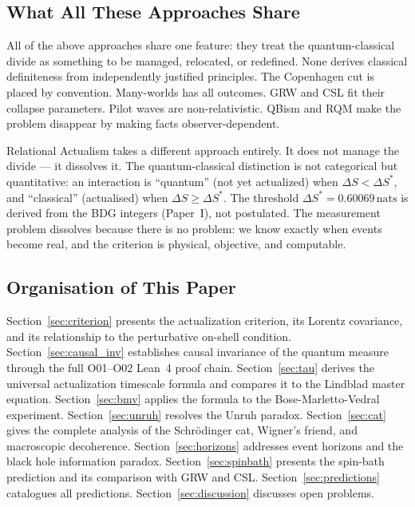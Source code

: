 \documentclass[12pt,a4paper]{article}
\begin{document}
\subsection{What All These Approaches Share}

All of the above approaches share one feature: they treat the quantum-classical divide as something to be managed, relocated, or redefined.  None derives classical definiteness from independently justified principles.  The Copenhagen cut is placed by convention.  Many-worlds has all outcomes.  GRW and CSL fit their collapse parameters.  Pilot waves are non-relativistic.  QBism and RQM make the problem disappear by making facts observer-dependent.

Relational Actualism takes a different approach entirely.  It does not manage the divide --- it dissolves it.  The quantum-classical distinction is not categorical but quantitative: an interaction is ``quantum'' (not yet actualized) when $\Delta S<\Delta S^*$, and ``classical'' (actualised) when $\Delta S\geq\Delta S^*$.  The threshold $\Delta S^*=0.60069\,\mathrm{nats}$ is derived from the BDG integers (Paper~I), not postulated.  The measurement problem dissolves because there is no problem: we know exactly when events become real, and the criterion is physical, objective, and computable.

\subsection{Organisation of This Paper}

Section~\ref{sec:criterion} presents the actualization criterion, its Lorentz covariance, and its relationship to the perturbative on-shell condition.  Section~\ref{sec:causal_inv} establishes causal invariance of the quantum measure through the full O01--O02 Lean~4 proof chain.  Section~\ref{sec:tau} derives the universal actualization timescale formula and compares it to the Lindblad master equation.  Section~\ref{sec:bmv} applies the formula to the Bose-Marletto-Vedral experiment.  Section~\ref{sec:unruh} resolves the Unruh paradox.  Section~\ref{sec:cat} gives the complete analysis of the Schr\"odinger cat, Wigner's friend, and macroscopic decoherence.  Section~\ref{sec:horizons} addresses event horizons and the black hole information paradox.  Section~\ref{sec:spinbath} presents the spin-bath prediction and its comparison with GRW and CSL.  Section~\ref{sec:predictions} catalogues all predictions.  Section~\ref{sec:discussion} discusses open problems.
\end{document}
